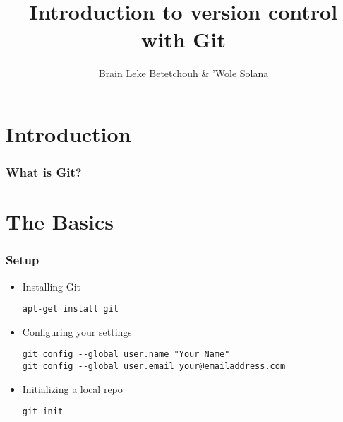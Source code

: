 \documentclass[10pt,t,sans,mathsans,xcolor=dvipsnames]{beamer}
\title{ Introduction to version control with Git }
\author{ Brain Leke Betetchouh \& 'Wole Solana }
\begin{document}
\frame [c, plain]{\titlepage}
\section{Introduction}
\begin{frame}
\frametitle{What is Git?}
\end{frame}
\section{The Basics}
\begin{frame}[fragile]
\frametitle{Setup}
\begin{itemize}
\item Installing Git
\begin{lstlisting}
apt-get install git
\end{lstlisting}
\item Configuring your settings
\begin{lstlisting}
git config --global user.name "Your Name"
git config --global user.email your@emailaddress.com
\end{lstlisting}
\item Initializing a local repo
\begin{lstlisting}
git init
\end{lstlisting}
\end{itemize}
\end{frame}
\end{document}
